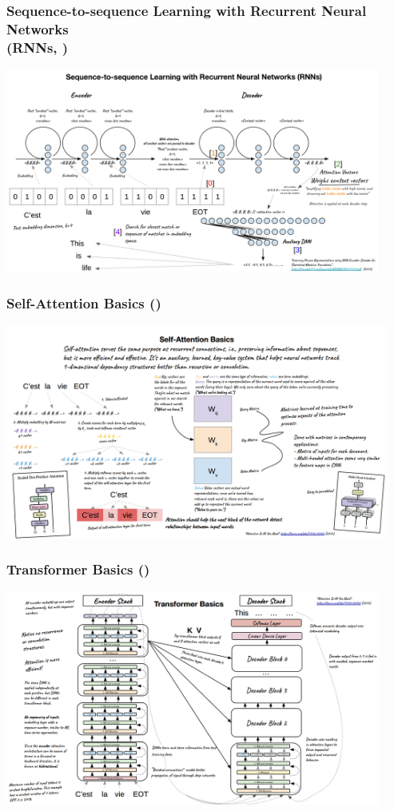 \documentclass[11pt,
               aspectratio=169,
               hyperref={colorlinks}
               ]{beamer}
\begin{document}
		\begin{frame}
			\frametitle{\small{Sequence-to-sequence Learning with Recurrent Neural Networks\\ (RNNs, \cite{cho2014learning})}}
			\centering
			\includegraphics[height=190pt]{../img/rnn.png}
		\end{frame}		

		\begin{frame}
			\frametitle{Self-Attention Basics (\cite{NIPS2017_3f5ee243})}
			\centering
			\includegraphics[height=200pt]{../img/attn.png}
		\end{frame}	
		
		\begin{frame}
			\frametitle{Transformer Basics (\cite{NIPS2017_3f5ee243})}
			\centering
			\includegraphics[height=200pt]{../img/trans.png}
		\end{frame}
		
\end{document}
